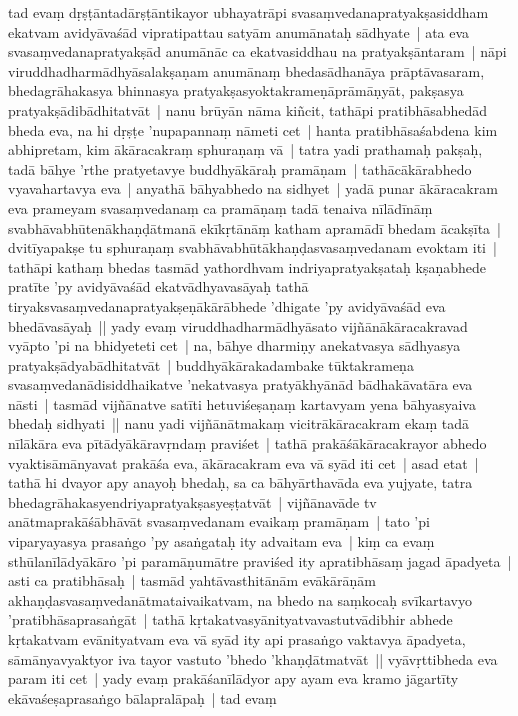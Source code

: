 \documentclass[article,12pt,a4paper]{memoir}%
\newcounter{parCount}
\begin{document}
	  
	  \pstart \leavevmode%
	\label{thakur75-143.1}tad evaṃ dṛṣṭāntadārṣṭāntikayor ubhayatrāpi svasaṃvedanapratyakṣasiddham ekatvam avidyāvaśād vipratipattau satyām anumānataḥ sādhyate | ata eva svasaṃvedanapratyakṣād anumānāc ca ekatvasiddhau na pratyakṣāntaram | nāpi viruddhadharmādhyāsalakṣaṇam anumānaṃ bhedasādhanāya prāptāvasaram, bhedagrāhakasya bhinnasya pratyakṣasyoktakrameṇāprāmāṇyāt, pakṣasya pratyakṣādibādhitatvāt | \label{thakur75-143.6} nanu brūyān nāma kiñcit, tathāpi pratibhāsabhedād bheda eva, na hi dṛṣṭe 'nupapannaṃ nāmeti cet | hanta pratibhāsaśabdena kim abhipretam, kim ākāracakraṃ sphuraṇaṃ vā | tatra yadi prathamaḥ pakṣaḥ, tadā bāhye 'rthe pratyetavye buddhyākāraḥ pramāṇam | tathācākārabhedo vyavahartavya eva | anyathā bāhyabhedo na sidhyet | yadā punar ākāracakram eva prameyam svasaṃvedanaṃ ca pramāṇaṃ tadā tenaiva nīlādīnāṃ svabhāvabhūtenākhaṇḍātmanā ekīkṛtānāṃ katham apramādī bhedam ācakṣīta | \label{thakur75-143.12} dvitīyapakṣe tu sphuraṇaṃ svabhāvabhūtākhaṇḍasvasaṃvedanam evoktam iti | tathāpi kathaṃ bhedas tasmād yathordhvam indriyapratyakṣataḥ kṣaṇabhede pratīte 'py avidyāvaśād ekatvādhyavasāyaḥ tathā tiryaksvasaṃvedanapratyakṣeṇākārābhede 'dhigate 'py avidyāvaśād eva bhedāvasāyaḥ || \label{thakur75-143.15} yady evaṃ viruddhadharmādhyāsato vijñānākāracakravad vyāpto 'pi na bhidyeteti cet | na, bāhye dharmiṇy anekatvasya sādhyasya pratyakṣādyabādhitatvāt | buddhyākārakadambake tūktakrameṇa svasaṃvedanādisiddhaikatve 'nekatvasya pratyākhyānād bādhakāvatāra eva nāsti | tasmād vijñānatve satīti hetuviśeṣaṇaṃ kartavyam yena bāhyasyaiva bhedaḥ sidhyati || \label{thakur75-143.20} nanu yadi vijñānātmakaṃ vicitrākāracakram ekaṃ tadā nīlākāra eva pītādyākāravṛndaṃ praviśet | tathā prakāśākāracakrayor abhedo vyaktisāmānyavat prakāśa eva, ākāracakram eva vā syād iti cet | asad etat | tathā hi dvayor apy anayoḥ  bhedaḥ, sa ca bāhyārthavāda eva yujyate, tatra bhedagrāhakasyendriyapratyakṣasyeṣṭatvāt | vijñānavāde tv anātmaprakāśābhāvāt svasaṃvedanam evaikaṃ pramāṇam | tato 'pi viparyayasya  prasaṅgo 'py asaṅgataḥ ity advaitam eva | \label{thakur75-143.26} kiṃ ca evaṃ sthūlanīlādyākāro 'pi paramāṇumātre praviśed ity apratibhāsaṃ jagad āpadyeta | asti ca pratibhāsaḥ | tasmād yahtāvasthitānām evākārāṇām akhaṇḍasvasaṃvedanātmataivaikatvam, na bhedo na saṃkocaḥ svīkartavyo 'pratibhāsaprasaṅgāt | tathā kṛtakatvasyānityatvavastutvādibhir abhede kṛtakatvam evānityatvam eva vā syād ity api prasaṅgo vaktavya āpadyeta, sāmānyavyaktyor iva tayor vastuto 'bhedo 'khaṇḍātmatvāt || \label{thakur75-143.31} vyāvṛttibheda eva param iti cet | yady evaṃ prakāśanīlādyor apy ayam eva kramo jāgartīty ekāvaśeṣaprasaṅgo bālapralāpaḥ | tad evaṃ
	{}
	\pend%
      
\end{document}
